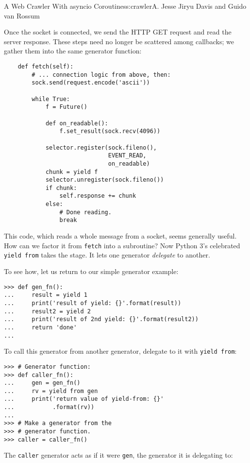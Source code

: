 \begin{aosachapter}{A Web Crawler With asyncio Coroutines}{s:crawler}{A. Jesse Jiryu Davis and Guido van Rossum}
\label{factoring-coroutines-with-yield-from}

Once the socket is connected, we send the HTTP GET request and read the
server response. These steps need no longer be scattered among
callbacks; we gather them into the same generator function:

\begin{verbatim}
    def fetch(self):
        # ... connection logic from above, then:
        sock.send(request.encode('ascii'))

        while True:
            f = Future()

            def on_readable():
                f.set_result(sock.recv(4096))

            selector.register(sock.fileno(),
                              EVENT_READ,
                              on_readable)
            chunk = yield f
            selector.unregister(sock.fileno())
            if chunk:
                self.response += chunk
            else:
                # Done reading.
                break
\end{verbatim}

This code, which reads a whole message from a socket, seems generally
useful. How can we factor it from \texttt{fetch} into a subroutine? Now
Python 3's celebrated \texttt{yield from} takes the stage. It lets one
generator \emph{delegate} to another.

To see how, let us return to our simple generator example:

\begin{verbatim}
>>> def gen_fn():
...     result = yield 1
...     print('result of yield: {}'.format(result))
...     result2 = yield 2
...     print('result of 2nd yield: {}'.format(result2))
...     return 'done'
...     
\end{verbatim}

To call this generator from another generator, delegate to it with
\texttt{yield from}:

\begin{verbatim}
>>> # Generator function:
>>> def caller_fn():
...     gen = gen_fn()
...     rv = yield from gen
...     print('return value of yield-from: {}'
...           .format(rv))
...
>>> # Make a generator from the
>>> # generator function.
>>> caller = caller_fn()
\end{verbatim}

The \texttt{caller} generator acts as if it were \texttt{gen}, the
generator it is delegating to:


\end{aosachapter}
